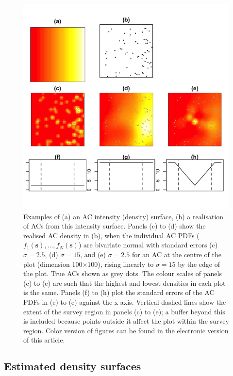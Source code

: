\documentclass[useAMS,usenatbib,referee]{biom}
\begin{document}
\begin{figure}[htbp]
\centering
\includegraphics[width=\textwidth]{example-densities.jpg}
\caption{Examples of (a) an AC intensity (density) surface, (b) a realisation of ACs from this intensity surface. Panels (c) to (d) show the realised AC density in (b), when the individual AC PDFs ($f_1(\bm{s}),\ldots,f_N(\bm{s})$) are bivariate normal with standard errors (c) $\sigma=2.5$, (d) $\sigma=15$, and (e) $\sigma=2.5$ for an AC at the centre of the plot (dimension 100$\times100$), rising linearly to $\sigma=15$ by the edge of the plot. True ACs shown as grey dots. The colour scales of panels (c) to (e) are such that the highest and lowest densities in each plot is the same. Panels (f) to (h) plot the standard errors of the AC PDFs in (c) to (e) against the x-axis. Vertical dashed lines show the extent of the survey region in panels (c) to (e); a buffer beyond this is included because points outside it affect the plot within the survey region. Color version of figures can be found in the electronic version of this article.}
\label{fig:densities}
\end{figure}

\subsection{Estimated density surfaces}
\end{document}
